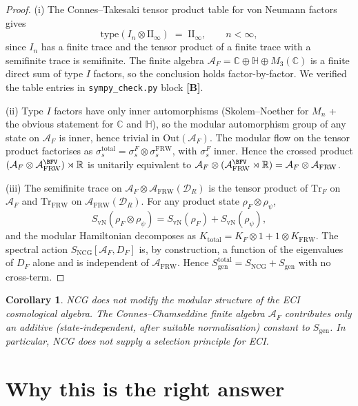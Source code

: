 \documentclass[11pt,a4paper]{article}
\newtheorem{corollary}[theorem]{Corollary}
\theoremstyle{definition}
\newcommand{\R}{\mathbb{R}}
\newcommand{\C}{\mathbb{C}}
\newcommand{\bbH}{\mathbb{H}}
\newcommand{\cA}{\mathcal{A}}
\newcommand{\cD}{\mathcal{D}}
\newcommand{\Tr}{\mathrm{Tr}}
\newcommand{\NCG}{\mathrm{NCG}}
\newcommand{\FRW}{\mathrm{FRW}}
\newcommand{\gen}{\mathrm{gen}}
\newcommand{\vN}{\mathrm{vN}}
\begin{document}
\begin{proof}[Proof]
(i) The Connes--Takesaki tensor product table for von Neumann factors
\cite[Ch.~XII]{Takesaki03} gives
\begin{equation}
\mathrm{type}(I_n \otimes \mathrm{II}_\infty) \;=\; \mathrm{II}_\infty,
\qquad n<\infty,
\end{equation}
since $I_n$ has a finite trace and the tensor product of a finite trace
with a semifinite trace is semifinite. The finite algebra
$\cA_F = \C \oplus \bbH \oplus M_3(\C)$ is a finite direct sum of type
$I$ factors, so the conclusion holds factor-by-factor. We verified the
table entries in \texttt{sympy\_check.py} block \textbf{[B]}.

(ii) Type $I$ factors have only inner automorphisms (Skolem--Noether for
$M_n$ + the obvious statement for $\C$ and $\bbH$), so the modular
automorphism group of any state on $\cA_F$ is inner, hence trivial in
$\mathrm{Out}(\cA_F)$. The modular flow on the tensor product factorises
as $\sigma_s^\mathrm{total} = \sigma_s^F \otimes \sigma_s^\FRW$, with
$\sigma_s^F$ inner. Hence the crossed product
$(\cA_F \otimes \cA_\FRW^\BFV) \rtimes \R$ is unitarily equivalent to
$\cA_F \otimes (\cA_\FRW^\BFV \rtimes \R) = \cA_F \otimes \cA_\FRW$.

(iii) The semifinite trace on $\cA_F\otimes\cA_\FRW(\cD_R)$ is the
tensor product of $\Tr_F$ on $\cA_F$ and $\Tr_\FRW$ on $\cA_\FRW(\cD_R)$.
For any product state $\rho_F \otimes \rho_\psi$,
\begin{equation}
S_\vN(\rho_F \otimes \rho_\psi)
= S_\vN(\rho_F) + S_\vN(\rho_\psi),
\end{equation}
and the modular Hamiltonian decomposes as $K_\mathrm{total} = K_F\otimes 1
+ 1\otimes K_\FRW$. The spectral action $S_\NCG[\cA_F, D_F]$ is, by
construction, a function of the eigenvalues of $D_F$ alone and is
independent of $\cA_\FRW$. Hence
$S_\gen^\mathrm{total} = S_\NCG + S_\gen$ with no cross-term.
\end{proof}

\begin{corollary}\label{cor:selection-fail}
NCG does not modify the modular structure of the ECI cosmological
algebra. The Connes--Chamseddine finite algebra $\cA_F$ contributes only
an additive (state-independent, after suitable normalisation) constant
to $S_\gen$. In particular, NCG does not supply a selection principle
for ECI.
\end{corollary}

\section{Why this is the right answer}
\end{document}

